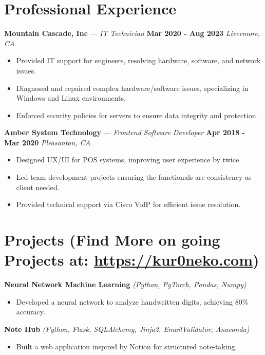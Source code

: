 \documentclass[letterpaper,11pt]{article}
\begin{document}
\section{Professional Experience}
\textbf{Mountain Cascade, Inc} — \textit{IT Technician} \hfill \textbf{Mar 2020 - Aug 2023}  
\textit{Livermore, CA}
\begin{itemize}[leftmargin=0.15in, label={}]
    \item Provided IT support for engineers, resolving hardware, software, and network issues.
    \item Diagnosed and repaired complex hardware/software issues, specializing in Windows and Linux environments.
    \item Enforced security policies for servers to ensure data integrity and protection.
\end{itemize}
\textbf{Amber System Technology} — \textit{Frontend Software Developer} \hfill \textbf{Apr 2018 - Mar 2020}  
\textit{Pleasanton, CA}
\begin{itemize}[leftmargin=0.15in, label={}]
    \item Designed UX/UI for POS systems, improving user experience by twice.
    \item Led team development projects ensuring the functionals are consistency as client needed.
    \item Provided technical support via Cisco VoIP for efficient issue resolution.
\end{itemize}


\section{Projects (Find More on going Projects at: \href{https://kur0neko.com}{https://kur0neko.com})}
\textbf{Neural Network Machine Learning} \textit{(Python, PyTorch, Pandas, Numpy)}  
\begin{itemize}[leftmargin=0.15in, label={}]
    \item Developed a neural network to analyze handwritten digits, achieving 80\% accuracy.
\end{itemize}
\textbf{Note Hub} \textit{(Python, Flask, SQLAlchemy, Jinja2, EmailValidator, Anaconda)}  
\begin{itemize}[leftmargin=0.15in, label={}]
    \item Built a web application inspired by Notion for structured note-taking.
\end{itemize}
\end{document}
